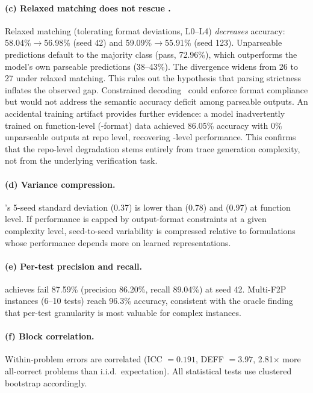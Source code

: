 \paragraph{(c) Relaxed matching does not rescue \cwm{}.}
Relaxed matching (tolerating format deviations, L0--L4) \emph{decreases} \cwm{} accuracy: 58.04\%$\to$56.98\% (seed 42) and 59.09\%$\to$55.91\% (seed 123). Unparseable predictions default to the majority class (pass, 72.96\%), which outperforms the model's own parseable predictions (38--43\%). The divergence widens from 26\pp{} to 27\pp{} under relaxed matching. This rules out the hypothesis that parsing strictness inflates the observed gap. Constrained decoding~\cite{willard2023outlines} could enforce format compliance but would not address the semantic accuracy deficit among parseable outputs. An accidental training artifact provides further evidence: a \cwm{} model inadvertently trained on function-level (\cls{}-format) data achieved 86.05\% accuracy with 0\% unparseable outputs at repo level, recovering \cls{}-level performance. This confirms that the repo-level \cwm{} degradation stems entirely from trace generation complexity, not from the underlying verification task.

\paragraph{(d) Variance compression.}
\cwm{}'s 5-seed standard deviation (0.37\pp{}) is lower than \cls{} (0.78\pp{}) and \traj{} (0.97\pp{}) at function level. If \cwm{} performance is capped by output-format constraints at a given complexity level, seed-to-seed variability is compressed relative to formulations whose performance depends more on learned representations.

\paragraph{(e) Per-test precision and recall.}
\cls{} achieves fail \fone{} 87.59\% (precision 86.20\%, recall 89.04\%) at seed 42.%
Multi-F2P instances (6--10 tests) reach 96.3\% accuracy, consistent with the oracle finding that per-test granularity is most valuable for complex instances.

\paragraph{(f) Block correlation.}
Within-problem errors are correlated (ICC $= 0.191$, DEFF $= 3.97$, 2.81$\times$ more all-correct problems than i.i.d.\ expectation). All statistical tests use clustered bootstrap accordingly.

